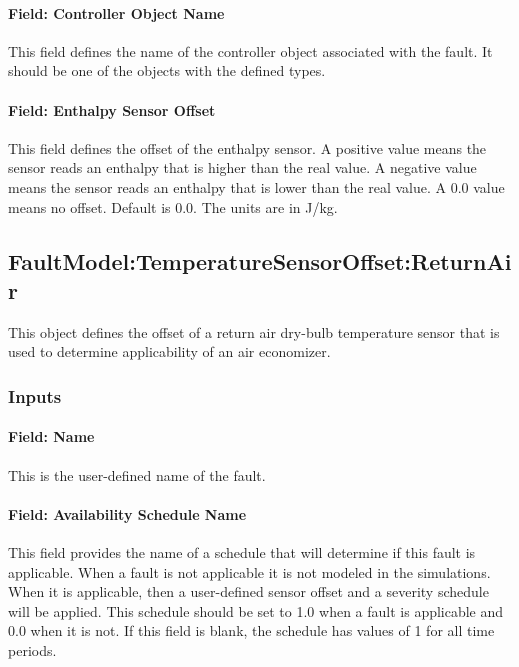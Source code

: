 \paragraph{Field: Controller Object Name}\label{field-controller-object-name-2}

This field defines the name of the controller object associated with the fault. It should be one of the objects with the defined types.

\paragraph{Field: Enthalpy Sensor Offset}\label{field-enthalpy-sensor-offset}

This field defines the offset of the enthalpy sensor. A positive value means the sensor reads an enthalpy that is higher than the real value. A negative value means the sensor reads an enthalpy that is lower than the real value. A 0.0 value means no offset. Default is 0.0. The units are in J/kg.

\subsection{FaultModel:TemperatureSensorOffset:ReturnAir}\label{faultmodeltemperaturesensoroffsetreturnair}

This object defines the offset of a return air dry-bulb temperature sensor that is used to determine applicability of an air economizer.

\subsubsection{Inputs}\label{inputs-3-022}

\paragraph{Field: Name}\label{field-name-3-020}

This is the user-defined name of the fault.

\paragraph{Field: Availability Schedule Name}\label{field-availability-schedule-name-3-004}

This field provides the name of a schedule that will determine if this fault is applicable. When a fault is not applicable it is not modeled in the simulations. When it is applicable, then a user-defined sensor offset and a severity schedule will be applied. This schedule should be set to 1.0 when a fault is applicable and 0.0 when it is not. If this field is blank, the schedule has values of 1 for all time periods.

